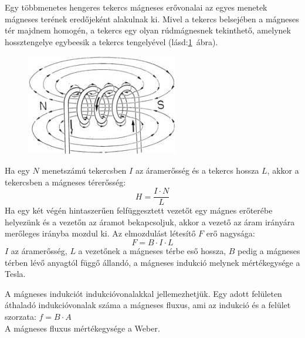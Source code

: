 Egy többmenetes hengeres tekercs mágneses erővonalai az egyes menetek mágneses terének eredőjeként alakulnak ki. Mivel a tekercs belsejében a mágneses tér majdnem homogén, a tekercs egy olyan rúdmágnesnek tekinthető, amelynek hossztengelye egybeesik a tekercs tengelyével (lásd:\ref{fig:9-coil}~ábra).
\begin{figure}[h]
	\centering
	\includegraphics[width=0.3\linewidth]{fig/9-Coil}
	\caption{}
	\label{fig:9-coil}
\end{figure}
Ha egy $N$ menetszámú tekercsben $I$ az áramerősség és a tekercs hossza $L$, akkor a tekercsben a mágneses térerősség:
$$H = \frac{I\cdot N}{L}$$
Ha egy két végén hintaszerűen felfüggesztett vezetőt egy mágnes erőterébe helyezünk és a vezetőn az áramot bekapcsoljuk, akkor a vezető az áram irányára merőleges irányba mozdul ki. Az elmozdulást létesítő $F$ erő nagysága:
$$ F = B \cdot I \cdot L $$
$I$ az áramerősség, $L$ a vezetőnek a mágneses térbe eső hossza, $B$ pedig a mágneses térben lévő anyagtól függő állandó, a mágneses indukció melynek mértékegysége a Tesla.

A mágneses indukciót indukcióvonalakkal jellemezhetjük. Egy adott felületen áthaladó indukcióvonalak száma a mágneses fluxus, ami az indukció és a felület szorzata: $f = B\cdot A$\\
A mágneses fluxus mértékegysége a Weber.

